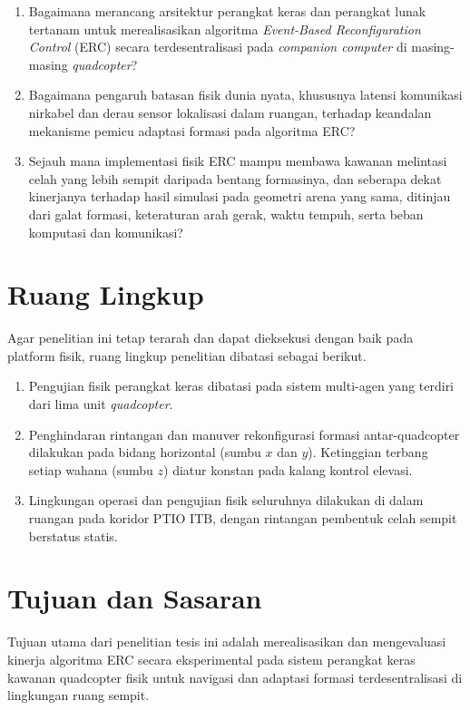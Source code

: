 \documentclass[12pt,a4paper]{report}
\begin{document}
\begin{enumerate}
    \item Bagaimana merancang arsitektur perangkat keras dan perangkat lunak tertanam untuk merealisasikan algoritma \textit{Event-Based Reconfiguration Control} (ERC) secara terdesentralisasi pada \textit{companion computer}\label{abbr:cc} di masing-masing \textit{quadcopter}?
    \item Bagaimana pengaruh batasan fisik dunia nyata, khususnya latensi komunikasi nirkabel dan derau sensor lokalisasi dalam ruangan, terhadap keandalan mekanisme pemicu adaptasi formasi pada algoritma ERC?
    \item Sejauh mana implementasi fisik ERC mampu membawa kawanan melintasi celah yang lebih sempit daripada bentang formasinya, dan seberapa dekat kinerjanya terhadap hasil simulasi pada geometri arena yang sama, ditinjau dari galat formasi, keteraturan arah gerak, waktu tempuh, serta beban komputasi dan komunikasi?
\end{enumerate}

\section{Ruang Lingkup}
Agar penelitian ini tetap terarah dan dapat dieksekusi dengan baik pada platform fisik, ruang lingkup penelitian dibatasi sebagai berikut.

\begin{enumerate}
    \item Pengujian fisik perangkat keras dibatasi pada sistem multi-agen yang terdiri dari lima unit \textit{quadcopter}.
    \item Penghindaran rintangan dan manuver rekonfigurasi formasi antar-quadcopter dilakukan pada bidang horizontal (sumbu $x$ dan $y$). Ketinggian terbang setiap wahana (sumbu $z$) diatur konstan pada kalang kontrol elevasi.
    \item Lingkungan operasi dan pengujian fisik seluruhnya dilakukan di dalam ruangan pada koridor PTIO ITB, dengan rintangan pembentuk celah sempit berstatus statis.
\end{enumerate}

\section{Tujuan dan Sasaran}
Tujuan utama dari penelitian tesis ini adalah merealisasikan dan mengevaluasi kinerja algoritma ERC secara eksperimental pada sistem perangkat keras kawanan quadcopter fisik untuk navigasi dan adaptasi formasi terdesentralisasi di lingkungan ruang sempit.
\end{document}
